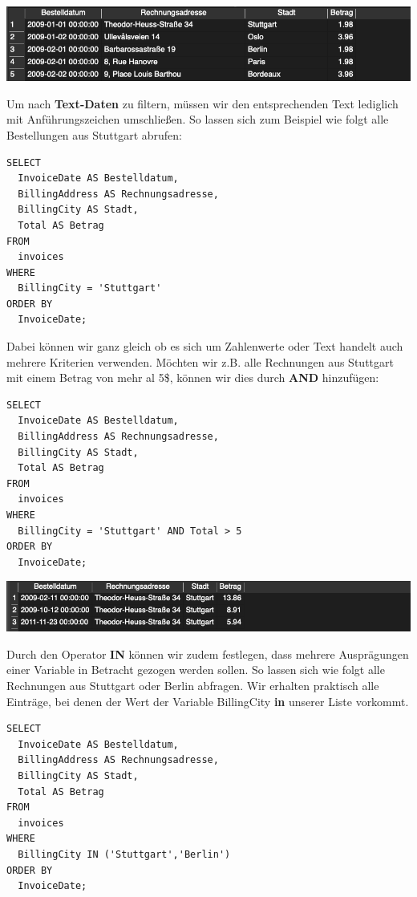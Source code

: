 \documentclass[
]{book}
\begin{document}
\includegraphics[width=10.41667in,height=\textheight]{img-WHERE2.png}

Um nach \textbf{Text-Daten} zu filtern, müssen wir den entsprechenden Text lediglich mit Anführungszeichen umschließen. So lassen sich zum Beispiel wie folgt alle Bestellungen aus Stuttgart abrufen:

\begin{verbatim}
SELECT
  InvoiceDate AS Bestelldatum,
  BillingAddress AS Rechnungsadresse,
  BillingCity AS Stadt,
  Total AS Betrag
FROM
  invoices
WHERE
  BillingCity = 'Stuttgart'
ORDER BY
  InvoiceDate;
\end{verbatim}

Dabei können wir ganz gleich ob es sich um Zahlenwerte oder Text handelt auch mehrere Kriterien verwenden. Möchten wir z.B. alle Rechnungen aus Stuttgart mit einem Betrag von mehr al 5\$, können wir dies durch \textbf{AND} hinzufügen:

\begin{verbatim}
SELECT
  InvoiceDate AS Bestelldatum,
  BillingAddress AS Rechnungsadresse,
  BillingCity AS Stadt,
  Total AS Betrag
FROM
  invoices
WHERE
  BillingCity = 'Stuttgart' AND Total > 5
ORDER BY
  InvoiceDate;
\end{verbatim}

\includegraphics[width=10.41667in,height=\textheight]{img-WHERE3.png}

Durch den Operator \textbf{IN} können wir zudem festlegen, dass mehrere Ausprägungen einer Variable in Betracht gezogen werden sollen. So lassen sich wie folgt alle Rechnungen aus Stuttgart oder Berlin abfragen. Wir erhalten praktisch alle Einträge, bei denen der Wert der Variable BillingCity \textbf{in} unserer Liste vorkommt.

\begin{verbatim}
SELECT
  InvoiceDate AS Bestelldatum,
  BillingAddress AS Rechnungsadresse,
  BillingCity AS Stadt,
  Total AS Betrag
FROM
  invoices
WHERE
  BillingCity IN ('Stuttgart','Berlin')
ORDER BY
  InvoiceDate;
\end{verbatim}
\end{document}
